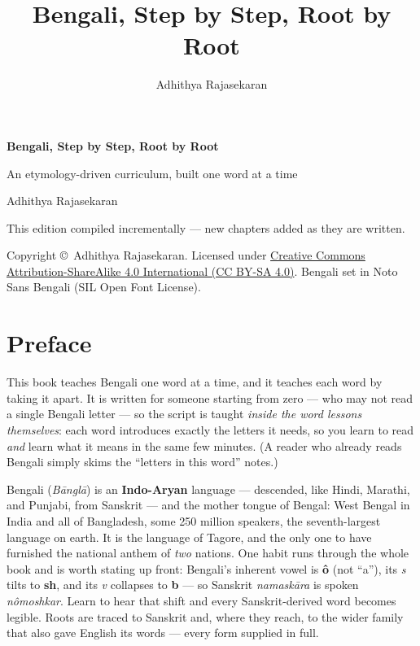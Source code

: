 \documentclass[11pt,twoside]{book}
\title{\Huge Bengali, Step by Step, Root by Root}
\author{Adhithya Rajasekaran}
\date{}
\begin{document}
\frontmatter

\begin{titlepage}
  \centering
  \vspace*{3cm}
  {\Huge\bfseries Bengali, Step by Step, Root by Root\par}
  \vspace{1cm}
  {\Large An etymology-driven curriculum, built one word at a time\par}
  \vspace{1.5cm}
  {\large Adhithya Rajasekaran\par}
  \vfill
  {\large This edition compiled incrementally --- new chapters added as they
  are written.\par}
  \vspace{2cm}
  {\normalsize
    Copyright \copyright\ Adhithya Rajasekaran. Licensed under
    \href{https://creativecommons.org/licenses/by-sa/4.0/}%
    {Creative Commons Attribution-ShareAlike 4.0 International (CC BY-SA 4.0)}.
    Bengali set in Noto Sans Bengali (SIL Open Font License).\par
  }
\end{titlepage}

\chapter*{Preface}

This book teaches Bengali one word at a time, and it teaches each word by taking
it apart. It is written for someone starting from zero --- who may not read a
single Bengali letter --- so the script is taught
\emph{inside the word lessons themselves}: each word introduces exactly the
letters it needs, so you learn to read  \emph{and} learn what it means
in the same few minutes. (A reader who already reads Bengali simply skims the
``letters in this word'' notes.)

Bengali (\emph{B\=angl\=a}) is an \textbf{Indo-Aryan} language --- descended, like
Hindi, Marathi, and Punjabi, from Sanskrit --- and the mother tongue of Bengal:
West Bengal in India and all of Bangladesh, some 250 million speakers, the
seventh-largest language on earth. It is the language of Tagore, and the only one
to have furnished the national anthem of \emph{two} nations. One habit runs
through the whole book and is worth stating up front: Bengali's inherent vowel is
\textbf{\^{o}} (not ``a''), its \emph{s} tilts to \textbf{sh}, and its \emph{v}
collapses to \textbf{b} --- so Sanskrit \emph{namask\=ara} is spoken
\emph{n\^{o}moshkar}. Learn to hear that shift and every Sanskrit-derived word
becomes legible. Roots are traced to Sanskrit and, where they reach, to the wider
family that also gave English its words --- every form supplied in full.
\end{document}
